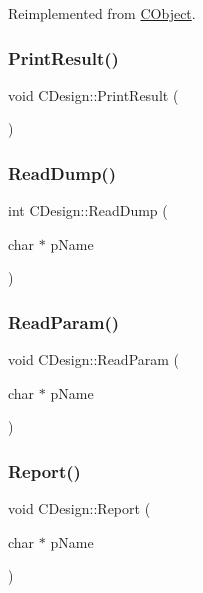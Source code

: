 Reimplemented from \mbox{\hyperlink{classCObject_a75afd905b2d14ed374c75d90f079a389}{C\+Object}}.

\mbox{\label{classCDesign_af1fc7df15f389d8051d74c7867d3d6be}} 
\subsubsection{\texorpdfstring{PrintResult()}{PrintResult()}}
{\footnotesize\ttfamily void C\+Design\+::\+Print\+Result (\begin{DoxyParamCaption}{ }\end{DoxyParamCaption})}

\mbox{\label{classCDesign_add678d74b22a8bd58dec921656454bdd}} 
\subsubsection{\texorpdfstring{ReadDump()}{ReadDump()}}
{\footnotesize\ttfamily int C\+Design\+::\+Read\+Dump (\begin{DoxyParamCaption}\item[{char $\ast$}]{p\+Name }\end{DoxyParamCaption})}

\mbox{\label{classCDesign_a91266987b4edb768fb3187e92a9cfbbd}} 
\subsubsection{\texorpdfstring{ReadParam()}{ReadParam()}}
{\footnotesize\ttfamily void C\+Design\+::\+Read\+Param (\begin{DoxyParamCaption}\item[{char $\ast$}]{p\+Name }\end{DoxyParamCaption})}

\mbox{\label{classCDesign_a0cbed390d0e0c05776aed59c16f7982c}} 
\subsubsection{\texorpdfstring{Report()}{Report()}}
{\footnotesize\ttfamily void C\+Design\+::\+Report (\begin{DoxyParamCaption}\item[{char $\ast$}]{p\+Name }\end{DoxyParamCaption})}

